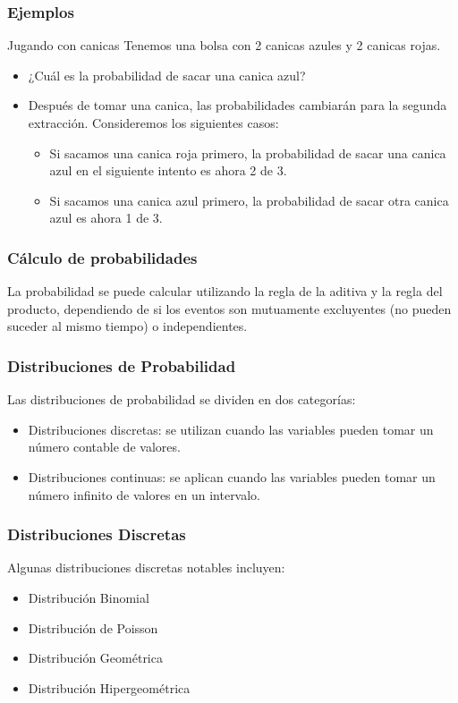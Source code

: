 \documentclass[aspectratio=169]{beamer}
\begin{document}
\begin{frame}
\frametitle{Ejemplos}
\begin{block}{Jugando con canicas}
Tenemos una bolsa con 2 canicas azules y 2 canicas rojas.

\begin{itemize}
    \item ¿Cuál es la probabilidad de sacar una canica azul?
    \item Después de tomar una canica, las probabilidades cambiarán para la segunda extracción. Consideremos los siguientes casos:
    \begin{itemize}
        \item Si sacamos una canica roja primero, la probabilidad de sacar una canica azul en el siguiente intento es ahora 2 de 3.
        \item Si sacamos una canica azul primero, la probabilidad de sacar otra canica azul es ahora 1 de 3.
    \end{itemize}
\end{itemize}
\end{block}

\end{frame}




\begin{frame}
\frametitle{Cálculo de probabilidades}
La probabilidad se puede calcular utilizando la regla de la aditiva y la regla del producto, dependiendo de si los eventos son mutuamente excluyentes (no pueden suceder al mismo tiempo) o independientes.
\end{frame}


\begin{frame}
\frametitle{Distribuciones de Probabilidad}

Las distribuciones de probabilidad se dividen en dos categorías:

\begin{itemize}
    \item Distribuciones discretas: se utilizan cuando las variables pueden tomar un número contable de valores.
    \item Distribuciones continuas: se aplican cuando las variables pueden tomar un número infinito de valores en un intervalo.
\end{itemize}

\end{frame}



\begin{frame}
\frametitle{Distribuciones Discretas}

Algunas distribuciones discretas notables incluyen:

\begin{itemize}
    \item Distribución Binomial
    \item Distribución de Poisson
    \item Distribución Geométrica
    \item Distribución Hipergeométrica
\end{itemize}

\end{frame}
\end{document}
